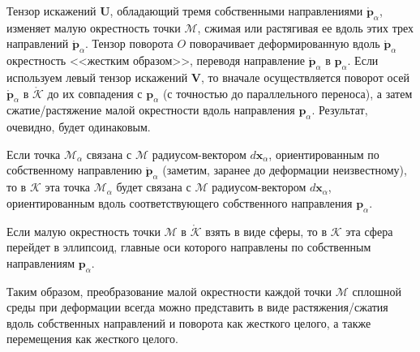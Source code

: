 Тензор искажений $\mathbf{U}$, обладающий тремя собственными направлениями
$\mathring{\mathbf{p}}_{\alpha}$, изменяет малую окрестность точки
$\mathcal{M}$, сжимая или растягивая ее вдоль этих трех направлений
$\mathring{\mathbf{p}}_{\alpha}$. Тензор поворота $ O $ поворачивает
деформированную вдоль $\mathring{\mathbf{p}}_{\alpha}$ окрестность
<<жестким образом>>, переводя направление $\mathring{\mathbf{p}}_{\alpha}$
в $\mathbf{p}_{\alpha}$. Если используем левый тензор искажений $\mathbf{V}$, то
вначале осуществляется поворот осей $\mathring{\mathbf{p}}_{\alpha}$ в
$\mathring{\mathcal{K}}$ до их совпадения с $\mathbf{p}_{\alpha}$ (с
точностью до параллельного переноса), а затем сжатие/растяжение малой
окрестности вдоль направления $\mathbf{p}_{\alpha}$. Результат, очевидно, будет
одинаковым.

Если точка $\mathcal{M}_{\alpha}$ связана с $\mathcal{M}$ радиусом-вектором $d
\mathbf{x}_{\alpha}$, ориентированным по собственному направлению
$\mathring{\mathbf{p}}_{\alpha}$ (заметим, заранее до деформации
неизвестному), то в $\mathcal{K}$ эта точка $\mathcal{M}_{\alpha}$ будет связана
с $\mathcal{M}$ радиусом-вектором $d \mathbf{x}_{\alpha}$, ориентированным вдоль
соответствующего собственного направления $\mathbf{p}_{\alpha}$.

Если малую окрестность точки $\mathcal{M}$ в $\mathring{\mathcal{K}}$
взять в виде сферы, то в $\mathcal{K}$ эта сфера перейдет в
эллипсоид, главные оси которого направлены по собственным направлениям
$\mathbf{p}_{\alpha}$.

Таким образом, преобразование малой окрестности каждой точки $\mathcal{M}$
сплошной среды при деформации всегда можно представить в виде растяжения/сжатия
вдоль собственных направлений и поворота как жесткого целого, а также
перемещения как жесткого целого.
